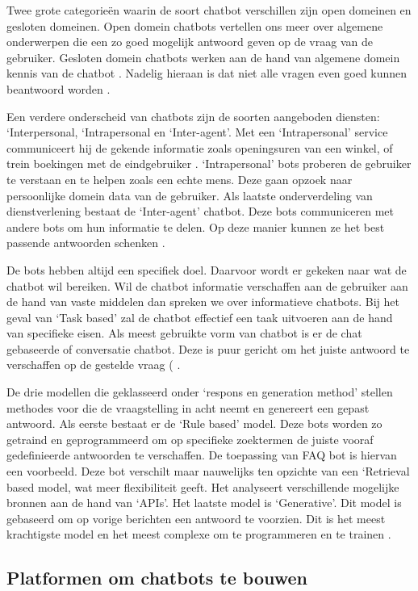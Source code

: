 Twee grote categorieën waarin de soort chatbot verschillen zijn open domeinen en gesloten domeinen. Open domein chatbots vertellen ons meer over algemene onderwerpen die een zo goed mogelijk antwoord geven op de vraag van de gebruiker. Gesloten domein chatbots werken aan de hand van algemene domein kennis van de chatbot \autocite{Adamopoulou2020}. Nadelig hieraan is dat niet alle vragen even goed kunnen beantwoord worden \autocite{Kucherbaev2018}.

Een verdere onderscheid van chatbots zijn de soorten aangeboden diensten: ‘Interpersonal, ‘Intrapersonal en ‘Inter-agent’. Met een ‘Intrapersonal’ service communiceert hij de gekende informatie zoals openingsuren van een winkel, of trein boekingen met de eindgebruiker \autocite{Adamopoulou2020}. ‘Intrapersonal’ bots proberen de gebruiker te verstaan en te helpen zoals een echte mens. Deze gaan opzoek naar persoonlijke domein data van de gebruiker. Als laatste onderverdeling van dienstverlening bestaat de ‘Inter-agent’ chatbot. Deze bots communiceren met andere bots om hun informatie te delen. Op deze manier kunnen ze het best passende antwoorden schenken \autocite{Nimavat2017}.

De bots hebben altijd een specifiek doel. Daarvoor wordt er gekeken naar wat de chatbot wil bereiken. Wil de chatbot informatie verschaffen aan de gebruiker aan de hand van vaste middelen dan spreken we over informatieve chatbots. Bij het geval van ‘Task based’ zal de chatbot effectief een taak uitvoeren aan de hand van specifieke eisen. Als meest gebruikte vorm van chatbot is er de chat gebaseerde of conversatie chatbot. Deze is puur gericht om het juiste antwoord te verschaffen op de gestelde vraag (\autocite{Nimavat2017} \autocite{Adamopoulou2020}. 

De drie modellen die geklasseerd onder ‘respons en generation method’ stellen methodes voor die de vraagstelling in acht neemt en genereert een gepast antwoord. Als eerste bestaat er de ‘Rule based’ model. Deze bots worden zo getraind en geprogrammeerd om op specifieke zoektermen de juiste vooraf gedefinieerde antwoorden te verschaffen. De toepassing van \ac{FAQ} bot is hiervan een voorbeeld. Deze bot verschilt maar nauwelijks ten opzichte van een ‘Retrieval based model, wat meer flexibiliteit geeft. Het analyseert verschillende mogelijke bronnen aan de hand van ‘APIs’. Het laatste model is ‘Generative’.  Dit model is gebaseerd om op vorige berichten een antwoord te voorzien. Dit is het meest krachtigste model en het meest complexe om te programmeren en te trainen \autocite{Adamopoulou2020} \autocite{Hien2018}.

\subsection{Platformen om chatbots te bouwen}%
\label{sec:chatbotBouwen}


